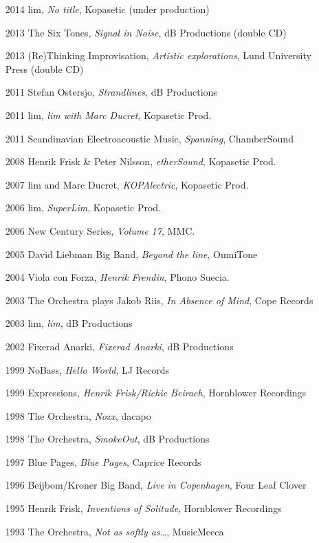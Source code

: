 \begin{enumerate}
\item [2014] lim, \emph{No title}, Kopasetic (under production)
\item [2013] The Six Tones, \emph{Signal in Noise}, dB
  Productions (double CD)
\item [2013] (Re)Thinking Improvisation, \emph{Artistic explorations},
  Lund University Press (double CD)
\item [2011] Stefan Ostersjo, \emph{Strandlines}, dB Productions
\item [2011] lim, \emph{lim with Marc Ducret}, Kopasetic Prod.
\item [2011] Scandinavian Electroacoustic Music, \emph{Spanning},
  ChamberSound
\item [2008] Henrik Frisk \& Peter Nilsson, \emph{etherSound},
  Kopasetic Prod.
\item [2007] lim and Marc Ducret, \emph{KOPAlectric}, Kopasetic Prod.
\item[2006] lim, \emph{SuperLim}, Kopasetic Prod.
\item[2006] New Century Series, \emph{Volume 17}, MMC.
\item[2005] David Liebman Big Band, \emph{Beyond the line}, OmniTone
\item[2004] Viola con Forza, \emph{Henrik Frendin}, Phono Suecia.
\item [2003] The Orchestra plays Jakob Riis, \emph{In Absence of
    Mind}, Cope Records
\item[2003] lim, \emph{lim}, dB Productions
\item[2002] Fixerad Anarki, \emph{Fixerad Anarki}, dB Productions
\item [1999] NoBass, \emph{Hello World}, LJ Records
\item[1999] Expressions, \emph{Henrik Frisk/Richie Beirach},
  Hornblower Recordings
\item [1998] The Orchestra, \emph{Noxx}, dacapo
\item[1998] The Orchestra, \emph{SmokeOut}, dB Productions
\item[1997] Blue Pages, \emph{Blue Pages}, Caprice Records
\item [1996] Beijbom/Kroner Big Band, \emph{Live in Copenhagen}, Four
  Leaf Clover
\item[1995] Henrik Frisk, \emph{Inventions of Solitude}, Hornblower
  Recordings
\item [1993] The Orchestra, \emph{Not as softly as\ldots}, MusicMecca
\end{enumerate}


